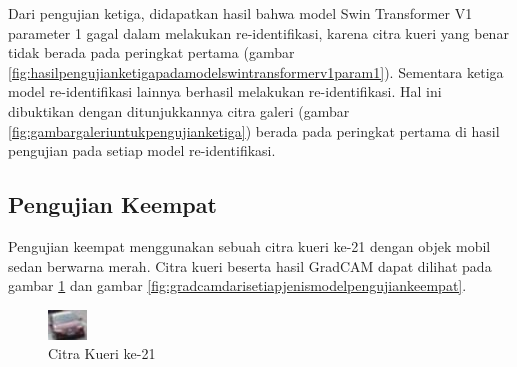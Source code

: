 Dari pengujian ketiga, didapatkan hasil bahwa model Swin Transformer V1 parameter 1 gagal dalam melakukan re-identifikasi, 
karena citra kueri yang benar tidak berada pada peringkat pertama (gambar 
\ref{fig:hasilpengujianketigapadamodelswintransformerv1param1}). Sementara ketiga model re-identifikasi lainnya berhasil 
melakukan re-identifikasi. Hal ini dibuktikan dengan ditunjukkannya citra galeri (gambar \ref{fig:gambargaleriuntukpengujianketiga})
berada pada peringkat pertama di hasil pengujian pada setiap model re-identifikasi.

\subsection{Pengujian Keempat}

Pengujian keempat menggunakan sebuah citra kueri ke-21 dengan objek mobil sedan berwarna merah. Citra kueri 
beserta hasil GradCAM dapat dilihat pada gambar \ref{fig:gambarkueriuntukpengujiankeempat} dan gambar 
\ref{fig:gradcamdarisetiapjenismodelpengujiankeempat}.

\begin{figure}[h!]
  \centering
  \includegraphics[scale=2]{gambar/Que21_1046.jpg}
  \caption{Citra Kueri ke-21}
  \label{fig:gambarkueriuntukpengujiankeempat}
\end{figure}


